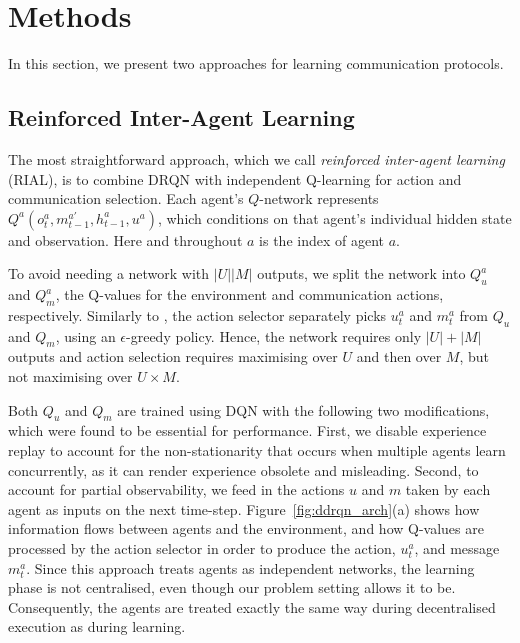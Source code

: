 \section{Methods}
\label{sec:methods}

In this section, we present two approaches for learning communication protocols. 
\vspace{-3mm}
\subsection{Reinforced Inter-Agent Learning}
The most straightforward approach, which we call \emph{reinforced inter-agent learning} (RIAL), is to combine DRQN with independent Q-learning for action and communication selection. Each agent's $Q$-network represents $Q^a(o^a_t, m^{a'}_{t-1}, h^a_{t-1},u^a)$, which conditions on that agent's individual hidden state and observation. Here and throughout $a$ is the index of agent $a$.

To avoid needing a network with $|U||M|$ outputs, we split the network into $Q^a_{u}$ and $Q^a_{m}$, the Q-values for the environment and communication actions, respectively.  Similarly to \cite{narasimhan2015language}, the action selector separately picks $u^a_t$ and $m^a_t$ from $Q_{u}$ and $Q_{m}$, using an $\epsilon$-greedy policy. Hence, the network requires only $|U| + |M|$ outputs and action selection requires maximising over $U$ and then over $M$, but not maximising over $U \times M$. 

Both $Q_{u}$ and $Q_{m}$ are trained using DQN with the following two modifications, which were found to be essential for performance.
First, we disable experience replay to account for the non-stationarity that occurs when multiple agents learn concurrently, as it can render experience obsolete and misleading. Second, to account for partial observability, we feed in the actions $u$ and $m$  taken by each agent as  inputs on the next time-step. Figure~\ref{fig:ddrqn_arch}(a) shows how information flows between agents and the environment, and how Q-values are processed by the action selector in order to produce the action, $u^a_t$, and message $m^a_t$.
Since this approach treats agents as independent networks, the learning phase is not centralised, even though our problem setting allows it to be. Consequently, the agents are treated exactly the same way during decentralised execution as during learning.


